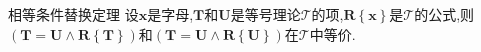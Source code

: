 \begin{metatheorem}{相等条件替换定理}{}
	设$\boldsymbol{x}$是字母,$\boldsymbol{T}$和$\boldsymbol{U}$是等号理论$\mathcal{T}$的项,$\boldsymbol{R}\left\{\boldsymbol{x}\right\}$是$\mathcal{T}$的公式,则$\left(\boldsymbol{T}=\boldsymbol{U}\wedge\boldsymbol{R}\left\{\boldsymbol{T}\right\}\right)$和$\left(\boldsymbol{T}=\boldsymbol{U}\wedge\boldsymbol{R}\left\{\boldsymbol{U}\right\}\right)$在$\mathcal{T}$中等价.
\end{metatheorem}
















